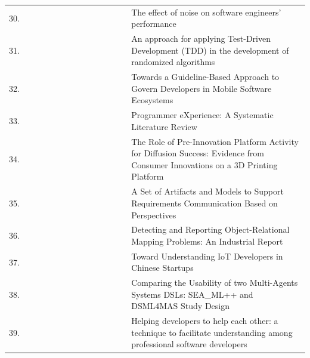 \documentclass[english, 12pt, a4paper, sci, utf8, a-1b, online]{aaltothesis}
\begin{document}
\begin{center}
\begin{longtable}{p{0.05\linewidth}p{0.35\linewidth}p{0.6\linewidth}}
    30. & \textcite{romano2018effect}                           & The effect of noise on software engineers' performance                                                                                      \\
    31. & \textcite{ivo2018approach}                            & An approach for applying Test-Driven Development (TDD) in the development of randomized algorithms                                          \\
    32. & \textcite{de2017towards}                              & Towards a Guideline-Based Approach to Govern Developers in Mobile Software Ecosystems                                                       \\
    33. & \textcite{programmer-experience}                      & Programmer eXperience: A Systematic Literature Review                                                                                       \\
    34. & \textcite{claussen2019role}                           & The Role of Pre-Innovation Platform Activity for Diffusion Success: Evidence from Consumer Innovations on a 3D Printing Platform            \\
    35. & \textcite{oran2017set}                                & A Set of Artifacts and Models to Support Requirements Communication Based on Perspectives                                                   \\
    36. & \textcite{nazariodetecting}                           & Detecting and Reporting Object-Relational Mapping Problems: An Industrial Report                                                            \\
    37. & \textcite{zhang2018toward}                            & Toward Understanding IoT Developers in Chinese Startups                                                                                     \\
    38. & \textcite{silva-comparing}                            & Comparing the Usability of two Multi-Agents Systems DSLs: SEA\_ML++ and DSML4MAS Study Design                                               \\
    39. & \textcite{ollis2019helping}                           & Helping developers to help each other: a technique to facilitate understanding among professional software developers
  \end{longtable}
\end{center}
\end{document}
